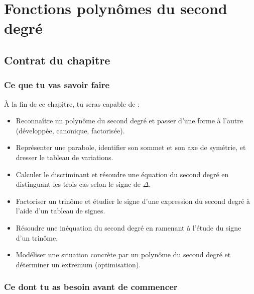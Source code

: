 
\chapter{Fonctions polynômes du second degré}

\section*{Contrat du chapitre}

\subsection*{Ce que tu vas savoir faire}

À la fin de ce chapitre, tu seras capable de :

\begin{itemize}
  \item[\textbf{C1}] Reconnaître un polynôme du second degré et passer d'une forme à l'autre (développée, canonique, factorisée).
  \item[\textbf{C2}] Représenter une parabole, identifier son sommet et son axe de symétrie, et dresser le tableau de variations.
  \item[\textbf{C3}] Calculer le discriminant et résoudre une équation du second degré en distinguant les trois cas selon le signe de $\Delta$.
  \item[\textbf{C4}] Factoriser un trinôme et étudier le signe d'une expression du second degré à l'aide d'un tableau de signes.
  \item[\textbf{C5}] Résoudre une inéquation du second degré en ramenant à l'étude du signe d'un trinôme.
  \item[\textbf{C6}] Modéliser une situation concrète par un polynôme du second degré et déterminer un extremum (optimisation).
\end{itemize}

\subsection*{Ce dont tu as besoin avant de commencer}

